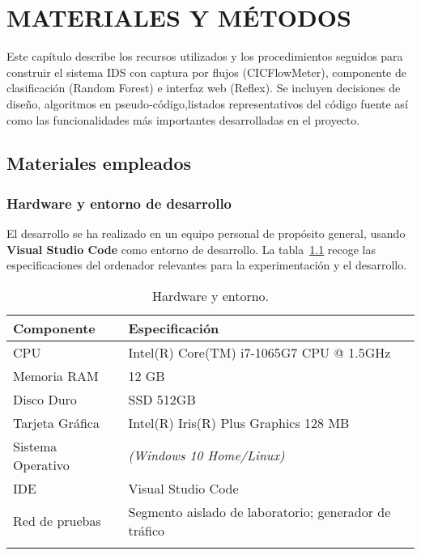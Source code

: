 \chapter{MATERIALES Y MÉTODOS}
Este capítulo describe los recursos utilizados y los procedimientos seguidos para construir el sistema IDS con captura por flujos (CICFlowMeter), componente de clasificación (Random Forest) e interfaz web (Reflex). Se incluyen decisiones de diseño, algoritmos en pseudo‑código,listados representativos del código fuente así como las funcionalidades más importantes desarrolladas en el proyecto.

\section{Materiales empleados}
\subsection{Hardware y entorno de desarrollo}

El desarrollo se ha realizado en un equipo personal de propósito general, usando \textbf{Visual Studio Code} como entorno de desarrollo. La tabla~\ref{tab:hw-mm} recoge las especificaciones del ordenador relevantes para la experimentación y el desarrollo.

\begin{longtable}{p{4cm}p{10cm}}
\textbf{Componente} & \textbf{Especificación} \\
\hline
CPU & Intel(R) Core(TM) i7-1065G7 CPU @ 1.5GHz \\
Memoria RAM & 12 GB \\
Disco Duro & SSD 512GB \\
Tarjeta Gráfica & Intel(R) Iris(R) Plus Graphics 128 MB \\
Sistema Operativo & \textit{(Windows 10 Home/Linux)} \\
IDE & Visual Studio Code \\
Red de pruebas & Segmento aislado de laboratorio; generador de tráfico \\
\hline
\caption{Hardware y entorno.}\label{tab:hw-mm}\\
\end{longtable}

